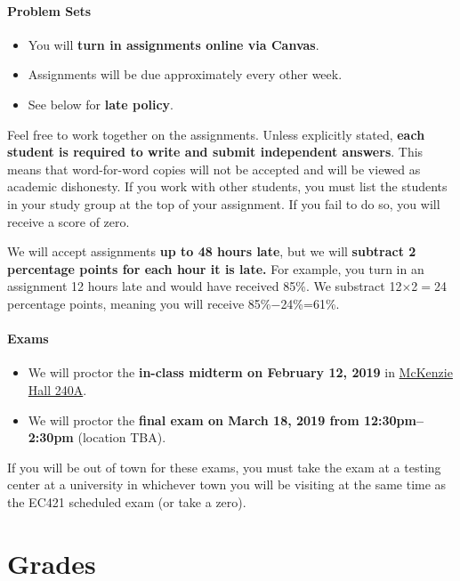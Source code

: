 \documentclass[10pt]{article}
\begin{document}
\paragraph{Problem Sets}
\begin{itemize}
  \item You will \textbf{turn in assignments online via Canvas}.
  \item Assignments will be due approximately every other week.
  \item See below for \textbf{late policy}.
\end{itemize}
Feel free to work together on the assignments. Unless explicitly stated, \textbf{each student is required to write and submit independent answers}. This means that word-for-word copies will not be accepted and will be viewed as academic dishonesty. If you work with other students, you must list the students in your study group at the top of your assignment. If you fail to do so, you will receive a score of zero.

We will accept assignments \textbf{up to 48 hours late}, but we will \textbf{subtract 2 percentage points for each hour it is late.} For example, you turn in an assignment 12 hours late and would have received 85\%. We substract 12$\times$2$=$24 percentage points, meaning you will receive 85\%$-$24\%=61\%.

\paragraph{Exams}
\begin{itemize}
  \item We will proctor the \textbf{in-class midterm on February 12, 2019} in \href{https://map.uoregon.edu/c721c7d95}{McKenzie Hall 240A}.
  \item We will proctor the \textbf{final exam on March 18, 2019 from 12:30pm--2:30pm} (location TBA).
\end{itemize}
If you will be out of town for these exams, you must take the exam at a testing center at a university in whichever town you will be visiting at the same time as the EC421 scheduled exam (or take a zero).

\section*{Grades}
\end{document}
